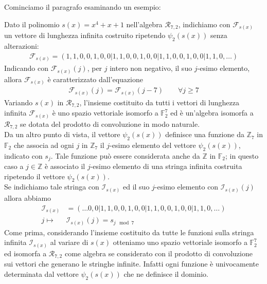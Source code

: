 Cominciamo il paragrafo esaminando un esempio:
\begin{esempio}\label{ese:ricorr1}
   Dato il polinomio $s(x) = x^4 + x+ 1$ nell'algebra $\mathcal{R}_{7,2}$, indichiamo con $\mathscr{F}_{s(x)}$ un vettore di lunghezza infinita costruito ripetendo $\psi_{2}(s(x))$ senza alterazioni:
   \begin{align*}
      \mathscr{F}_{s(x)} = (1,1,0,0,1,0,0 | 1,1,0,0,1,0,0  | 1,1,0,0,1,0,0 | 1,1,0, \dots )
   \end{align*}
   Indicando con $\mathscr{F}_{s(x)}(j)$, per $j$ intero non negativo, il suo $j$-esimo elemento, allora $\mathscr{F}_{s(x)}$ è caratterizzato dall'equazione
   \begin{align*}
      \mathscr{F}_{s(x)} (j) = \mathscr{F}_{s(x)} (j-7) \qquad \forall j \geq 7
   \end{align*}
   Variando $s(x)$ in $\mathcal{R}_{7,2}$, l'insieme costituito da tutti i vettori di lunghezza infinita $\mathscr{F}_{s(x)}$ è uno spazio vettoriale isomorfo a $\mathbb{F}_{2}^{7}$ ed è un'algebra isomorfa a $\mathcal{R}_{7,2}$ se dotata del prodotto di convoluzione in modo naturale.\\
   Da un altro punto di vista, il vettore $\psi_{2}(s(x))$ definisce una funzione da $\mathbb{Z}_{7}$ in $\mathbb{F}_{2}$ che associa ad ogni $j$ in $\mathbb{Z}_{7}$ il $j$-esimo elemento del vettore $\psi_{2}(s(x))$, indicato con $s_j$. Tale funzione può essere considerata anche da $\mathbb{Z}$ in $\mathbb{F}_{2}$; in questo caso a $j \in \mathbb{Z}$ è associato il $j$-esimo elemento di una stringa infinita costruita ripetendo il vettore $\psi_{2}(s(x))$.\\
   Se indichiamo tale stringa con $\mathscr{I}_{s(x)}$ ed il suo $j$-esimo elemento con $\mathscr{I}_{s(x)}(j)$ allora abbiamo
   \begin{align*}
      \mathscr{I}_{s(x)} &= ( \dots 0,0 | 1,1,0,0,1,0,0  | 1,1,0,0,1,0,0 | 1,1,0, \dots ) \\
      j \longmapsto & \mathscr{I}_{s(x)}(j) = s_{j \mod{7}}
   \end{align*}
   Come prima, considerando l'insieme costituito da tutte le funzioni sulla stringa infinita $\mathscr{I}_{s(x)}$ al variare di $s(x)$ otteniamo uno spazio vettoriale isomorfo a $\mathbb{F}_{2}^{7}$ ed isomorfa a $\mathcal{R}_{7,2}$ come algebra se considerato con il prodotto di convoluzione sui vettori che generano le stringhe infinite. Infatti ogni funzione è univocamente determinata dal vettore $\psi_{2}(s(x))$ che ne definisce il dominio. \\
\end{esempio}
